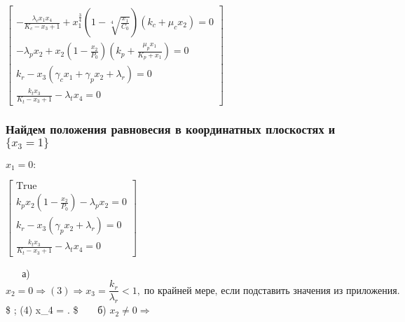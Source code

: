 \documentclass[11pt]{article}
\begin{document}
    $\displaystyle \left[\begin{matrix}- \frac{\lambda_{c} x_{1} x_{4}}{K_{c} - x_{3} + 1} + x_{1}^{\frac{3}{4}} \left(1 - \sqrt[4]{\frac{x_{1}}{C_{0}}}\right) \left(k_{c} + \mu_{c} x_{2}\right) = 0\\- \lambda_{p} x_{2} + x_{2} \left(1 - \frac{x_{2}}{P_{0}}\right) \left(k_{p} + \frac{\mu_{p} x_{1}}{K_{p} + x_{1}}\right) = 0\\k_{r} - x_{3} \left(\gamma_{c} x_{1} + \gamma_{p} x_{2} + \lambda_{r}\right) = 0\\\frac{k_{t} x_{3}}{K_{t} - x_{3} + 1} - \lambda_{t} x_{4} = 0\end{matrix}\right]$

    
    \hypertarget{ux43dux430ux439ux434ux435ux43c-ux43fux43eux43bux43eux436ux435ux43dux438ux44f-ux440ux430ux432ux43dux43eux432ux435ux441ux438ux44f-ux432-ux43aux43eux43eux440ux434ux438ux43dux430ux442ux43dux44bux445-ux43fux43bux43eux441ux43aux43eux441ux442ux44fux445-ux438-x_3-1}{%
\subsubsection{\texorpdfstring{Найдем положения равновесия в
координатных плоскостях и
\(\{x_3 = 1\}\)}{Найдем положения равновесия в координатных плоскостях и \textbackslash\{x\_3 = 1\textbackslash\}}}\label{ux43dux430ux439ux434ux435ux43c-ux43fux43eux43bux43eux436ux435ux43dux438ux44f-ux440ux430ux432ux43dux43eux432ux435ux441ux438ux44f-ux432-ux43aux43eux43eux440ux434ux438ux43dux430ux442ux43dux44bux445-ux43fux43bux43eux441ux43aux43eux441ux442ux44fux445-ux438-x_3-1}}

    $x_1 = 0:$

    
    $\displaystyle \left[\begin{matrix}\text{True}\\k_{p} x_{2} \left(1 - \frac{x_{2}}{P_{0}}\right) - \lambda_{p} x_{2} = 0\\k_{r} - x_{3} \left(\gamma_{p} x_{2} + \lambda_{r}\right) = 0\\\frac{k_{t} x_{3}}{K_{t} - x_{3} + 1} - \lambda_{t} x_{4} = 0\end{matrix}\right]$

    
    \(\phantom{tab}\) а)
\(x_2 = 0 \Rightarrow (3) \Rightarrow x_3 = \dfrac{k_r}{\lambda_r} < 1, \; \text{по крайней мере, если подставить значения из приложения.}\)
\$ ; (4) \Rightarrow x\_4 =
. \text{}\$
\(\phantom{tab}\) б) \(x_2 \neq 0 \Rightarrow\)
\end{document}
